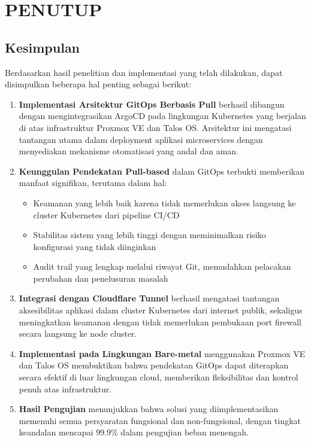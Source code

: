 \chapter{PENUTUP}
\section{Kesimpulan}

Berdasarkan hasil penelitian dan implementasi yang telah dilakukan, dapat
disimpulkan beberapa hal penting sebagai berikut:

\begin{enumerate}[label=\alph*.]
  \item \textbf{Implementasi Arsitektur GitOps Berbasis Pull} berhasil dibangun dengan mengintegrasikan ArgoCD pada lingkungan Kubernetes yang berjalan di atas infrastruktur Proxmox VE dan Talos OS. Arsitektur ini mengatasi tantangan utama dalam deployment aplikasi microservices dengan menyediakan mekanisme otomatisasi yang andal dan aman.

  \item \textbf{Keunggulan Pendekatan Pull-based} dalam GitOps terbukti memberikan manfaat signifikan, terutama dalam hal:
        \begin{itemize}
          \item Keamanan yang lebih baik karena tidak memerlukan akses langsung ke cluster
                Kubernetes dari pipeline CI/CD
          \item Stabilitas sistem yang lebih tinggi dengan meminimalkan risiko konfigurasi yang
                tidak diinginkan
          \item Audit trail yang lengkap melalui riwayat Git, memudahkan pelacakan perubahan
                dan penelusuran masalah
        \end{itemize}

  \item \textbf{Integrasi dengan Cloudflare Tunnel} berhasil mengatasi tantangan aksesibilitas aplikasi dalam cluster Kubernetes dari internet publik, sekaligus meningkatkan keamanan dengan tidak memerlukan pembukaan port firewall secara langsung ke node cluster.

  \item \textbf{Implementasi pada Lingkungan Bare-metal} menggunakan Proxmox VE dan Talos OS membuktikan bahwa pendekatan GitOps dapat diterapkan secara efektif di luar lingkungan cloud, memberikan fleksibilitas dan kontrol penuh atas infrastruktur.

  \item \textbf{Hasil Pengujian} menunjukkan bahwa solusi yang diimplementasikan memenuhi semua persyaratan fungsional dan non-fungsional, dengan tingkat keandalan mencapai 99.9\% dalam pengujian beban menengah.
\end{enumerate}

